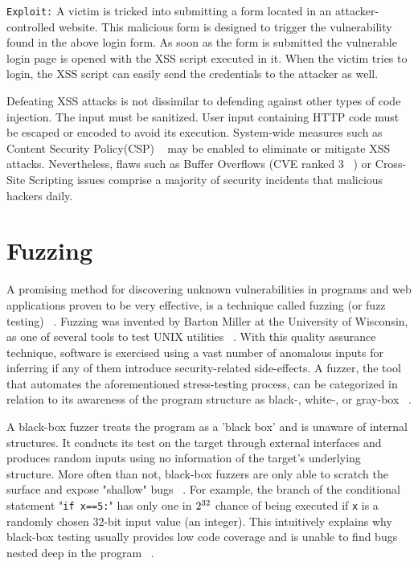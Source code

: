 {\tt Exploit:} A victim is tricked into submitting a form located in an attacker-controlled website. This malicious form is designed to trigger the vulnerability found in the above login form. As soon as the form is submitted the vulnerable login page is opened with the XSS script executed in it. When the victim tries to login, the XSS script can easily send the credentials to the attacker as well. 

Defeating XSS attacks is not dissimilar to defending against other types of code injection.
The input must be sanitized. User input containing HTTP code must be escaped or encoded to avoid its execution. System-wide measures such as Content Security Policy(CSP) ~\cite{csp_def} may be enabled to eliminate or mitigate XSS attacks. Nevertheless, flaws such as Buffer Overflows (CVE ranked 3 ~\cite{cve}) or Cross-Site Scripting issues comprise a majority of security incidents that malicious hackers daily. 

\section{Fuzzing}
A promising method for discovering unknown vulnerabilities in programs and web applications proven to be very effective, is a technique called fuzzing (or fuzz testing) ~\cite{fuzzing_def}. Fuzzing was invented by Barton Miller at the University of Wisconsin, as one of several tools to test UNIX utilities ~\cite{mller1990fuzz}. With this quality assurance technique, software is exercised using a vast number of anomalous inputs for inferring if any of them introduce security-related side-effects. A fuzzer, the tool that automates the aforementioned stress-testing process, can be categorized in relation to its awareness of the program structure as black-, white-, or gray-box ~\cite{fuzzing_book}. 

A black-box fuzzer treats the program as a 'black box' and is unaware of internal structures. It conducts its test on the target through external interfaces and produces random inputs using no information of the target's underlying structure. More often than not, black-box fuzzers are only able to scratch the surface and expose "shallow" bugs ~\cite{fuzzing_owasp}. For example, the branch of the conditional statement "{\tt if x==5:}" has only one in $2\textsuperscript{32}$ chance of being executed if {\tt x} is a randomly chosen 32-bit input value (\ie an integer). This intuitively explains why black-box testing usually provides low code coverage and is unable to find bugs nested deep in the program ~\cite{Godefroid2008AutomatedWF}.

